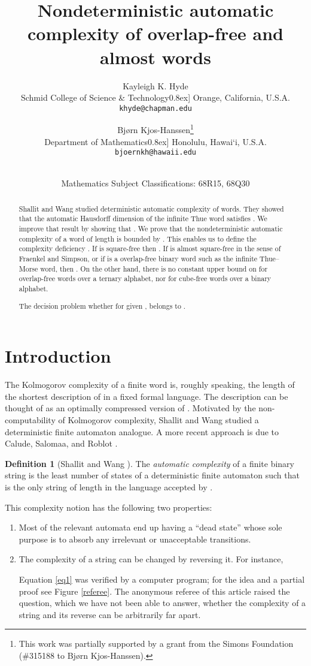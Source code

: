 \documentclass[12pt]{article}
\title{
	Nondeterministic automatic complexity of overlap-free and almost {\squarefree} words
}
\author{Kayleigh K. Hyde\\
\small Schmid College of Science \& Technology\-0.8ex] 
\small Orange, California, U.S.A.\\
\small\tt khyde@chapman.edu\\
\and
Bj{\o}rn Kjos-Hanssen\thanks{This work was partially supported by a grant from the Simons Foundation (\#315188 to Bj\o rn Kjos-Hanssen).}\\
\small Department of Mathematics\-0.8ex]
\small Honolulu, Hawai\textquoteleft i, U.S.A.\\
\small\tt bjoernkh@hawaii.edu\\
}
\date{
	\dateline{November 24, 2014}{July 29, 2015}\\
	\small Mathematics Subject Classifications: 68R15, 68Q30
}
\theoremstyle{plain}
\theoremstyle{definition}
\newtheorem{df}[thm]{Definition}
\theoremstyle{remark}
\begin{document}
	\maketitle{}
	\begin{abstract}
		Shallit and Wang studied deterministic automatic complexity of words. 
		They showed that the automatic Hausdorff dimension  of the infinite Thue word satisfies .
		We improve that result by showing that .
		We prove that the nondeterministic automatic complexity  of a word  of length  is bounded by .
		This enables us to define the complexity deficiency .
		If  is square-free then . If  is almost square-free in the sense of Fraenkel and Simpson,
		or if  is a overlap-free binary word such as the infinite Thue--Morse word, then .
		On the other hand, there is no constant upper bound on  for overlap-free words over a ternary alphabet,
		nor for cube-free words over a binary alphabet.
		
		
		
		The decision problem whether  for given ,  belongs to .
	\end{abstract}

	\section{Introduction}
		The Kolmogorov complexity of a finite word  is, roughly speaking,
		the length of the shortest description  of  in a fixed formal language.
		The description  can be thought of as an optimally compressed version of .
		Motivated by the non-computability of Kolmogorov complexity,
		Shallit and Wang \cite{MR1897300} studied a deterministic finite automaton analogue.
		A more recent approach is due to Calude, Salomaa, and Roblot \cite{Calude}.

		\begin{df}[Shallit and Wang \cite{MR1897300}]
			The \emph{automatic complexity} of a finite binary string  is 
			the least number  of states of a {deterministic finite automaton}  such that 
			 is the only string of length  in the language accepted by .
		\end{df}
		This complexity notion has the following two properties:
		\begin{enumerate}
			\item{} Most of the relevant automata end up
				having a ``dead state'' whose sole purpose is to absorb any irrelevant or
				unacceptable transitions.
			\item{} The complexity of a string can be changed by reversing it. For instance,
				
			Equation \ref{eq1} was verified by a computer program; for the idea and a partial proof see Figure \ref{referee}.
			The anonymous referee of this article raised the question, which we have not been able to answer,
			whether the complexity of a string and its reverse can be arbitrarily far apart.
		\end{enumerate}
\end{document}
